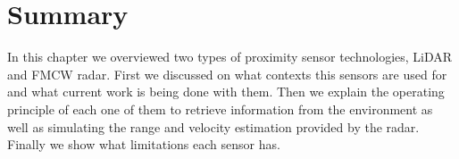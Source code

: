 \section{Summary}
In this chapter we overviewed two types of proximity sensor technologies, \ac{LiDAR} and \ac{FMCW} radar. First we discussed on what contexts this sensors are used for and what current work is being done with them. Then we explain the operating principle of each one of them to retrieve information from the environment as well as simulating the range and velocity estimation provided by the radar.  Finally we show what limitations each sensor has.





